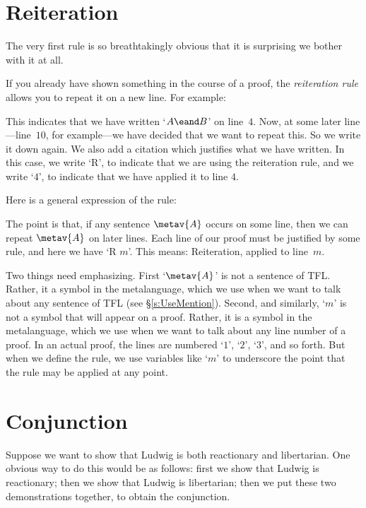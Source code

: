 \section{Reiteration}
The very first rule is so breathtakingly obvious that it is surprising we bother with it at all.

If you already have shown something in the course of a proof, the \emph{reiteration rule} allows you to repeat it on a new line. For example:
\begin{fitchproof}
	\have[$\vdots$]{}{\vdots}
	 
\end{fitchproof}
This indicates that we have written `$A \eand B$' on line~$4$. Now, at some later line---line~$10$, for example---we have decided that we want to repeat this. So we write it down again. We also add a citation which justifies what we have written. In this case, we write `R', to indicate that we are using the reiteration rule, and we write `$4$', to indicate that we have applied it to line $4$.

Here is a general expression of the rule:
\begin{fitchproof}
	 
\end{fitchproof}
The point is that, if any sentence $\metav{A}$ occurs on some line, then we can repeat $\metav{A}$ on later lines. Each line of our proof must be justified by some rule, and here we have `R $m$'. This means: Reiteration, applied to line~$m$.

Two things need emphasizing. First `$\metav{A}$' is not a sentence of TFL. Rather, it a symbol in the metalanguage, which we use when we want to talk about any sentence of TFL (see \S\ref{s:UseMention}). Second, and similarly, `$m$' is not a symbol that will appear on a proof. Rather, it is a symbol in the metalanguage, which we use when we want to talk about any line number of a proof. In an actual proof, the lines are numbered `$1$', `$2$', `$3$', and so forth. But when we define the rule, we use variables like `$m$' to underscore the point that the rule may be applied at any point.

\section{Conjunction}
Suppose we want to show that Ludwig is both reactionary and libertarian. One obvious way to do this would be as follows: first we show that Ludwig is reactionary; then we show that Ludwig is libertarian; then we put these two demonstrations together, to obtain the conjunction.

